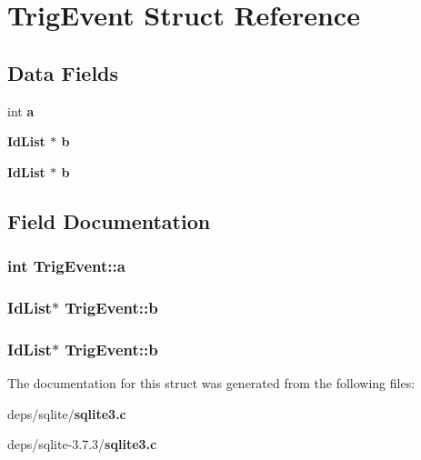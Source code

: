 \section{Trig\-Event Struct Reference}
\label{structTrigEvent}
\subsection*{Data Fields}
\begin{CompactItemize}
\item 
int \bf{a}
\item 
\bf{Id\-List} $\ast$ \bf{b}
\item 
\bf{Id\-List} $\ast$ \bf{b}
\end{CompactItemize}


\subsection{Field Documentation}
\subsubsection{\setlength{\rightskip}{0pt plus 5cm}int \bf{Trig\-Event::a}}\label{structTrigEvent_2997bd5c54ebc54c6d07d38599a06a01}


\subsubsection{\setlength{\rightskip}{0pt plus 5cm}\bf{Id\-List}$\ast$ \bf{Trig\-Event::b}}\label{structTrigEvent_2f6d7e69854b24a0cebeae9a092d4b12}


\subsubsection{\setlength{\rightskip}{0pt plus 5cm}\bf{Id\-List}$\ast$ \bf{Trig\-Event::b}}\label{structTrigEvent_2f6d7e69854b24a0cebeae9a092d4b12}




The documentation for this struct was generated from the following files:\begin{CompactItemize}
\item 
deps/sqlite/\bf{sqlite3.c}\item 
deps/sqlite-3.7.3/\bf{sqlite3.c}\end{CompactItemize}
